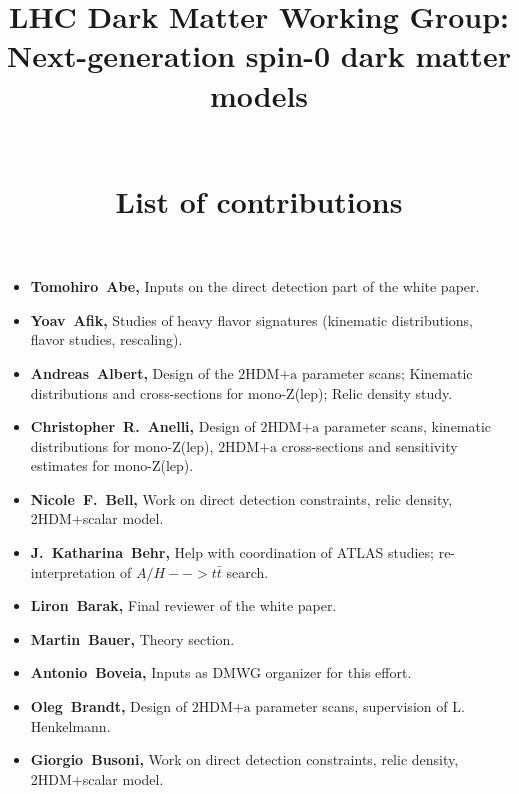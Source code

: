 \documentclass[a4paper, 11pt,notoc]{article}
\newcommand{\hdma}{\ensuremath{\textrm{2HDM+a}}\xspace}
\begin{document}
\title{\begin{boldmath} \huge LHC Dark Matter Working Group:  \\ Next-generation spin-0  dark matter models \vspace{7mm} \end{boldmath} \\ List of contributions}

\maketitle

\begin{itemize}

\item \textbf{Tomohiro~Abe,} Inputs on the direct detection part of the white paper. 

\item \textbf{Yoav~Afik,} Studies of heavy flavor signatures (kinematic distributions, flavor studies, rescaling). 

\item \textbf{Andreas~Albert,} Design of the \hdma parameter scans; Kinematic distributions and cross-sections for mono-Z(lep); Relic density study.

\item \textbf{Christopher~R.~Anelli,} Design of \hdma parameter scans,  kinematic distributions for mono-Z(lep), \hdma cross-sections and sensitivity estimates for mono-Z(lep).

\item \textbf{Nicole~F.~Bell,} Work on direct detection constraints, relic density, 2HDM+scalar model.

\item \textbf{J.~Katharina~Behr,} Help with coordination of ATLAS studies; re-interpretation of $A/H-->t\bar{t}$ search.

\item \textbf{Liron~Barak,} Final reviewer of the white paper. 

\item \textbf{Martin~Bauer,} Theory section. 

\item \textbf{Antonio~Boveia,} Inputs as DMWG organizer for this effort. 

\item \textbf{Oleg~Brandt,} Design of \hdma parameter scans, supervision of L. Henkelmann. 

\item \textbf{Giorgio~Busoni,} Work on direct detection constraints, relic density, 2HDM+scalar model.


\end{itemize}
\end{document}
